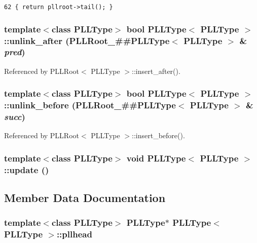 \footnotesize\begin{verbatim}62 { return pllroot->tail(); } 
\end{verbatim}\normalsize 
{}
\subsubsection{\setlength{\rightskip}{0pt plus 5cm}template$<$class PLLType$>$ bool PLLType$<$ PLLType $>$::unlink\_\-after (PLLRoot\_\-\#\#PLLType$<$ PLLType $>$ \& {\em pred})\hspace{0.3cm}{\tt  [inline]}}\label{classPLLType_a11}




Referenced by PLLRoot$<$ PLLType $>$::insert\_\-after().
\subsubsection{\setlength{\rightskip}{0pt plus 5cm}template$<$class PLLType$>$ bool PLLType$<$ PLLType $>$::unlink\_\-before (PLLRoot\_\-\#\#PLLType$<$ PLLType $>$ \& {\em succ})\hspace{0.3cm}{\tt  [inline]}}\label{classPLLType_a10}




Referenced by PLLRoot$<$ PLLType $>$::insert\_\-before().
\subsubsection{\setlength{\rightskip}{0pt plus 5cm}template$<$class PLLType$>$ void PLLType$<$ PLLType $>$::update ()\hspace{0.3cm}{\tt  [inline]}}\label{classPLLType_a18}




\subsection{Member Data Documentation}
\subsubsection{\setlength{\rightskip}{0pt plus 5cm}template$<$class PLLType$>$ PLLType$\ast$ PLLType$<$ PLLType $>$::pllhead\hspace{0.3cm}{\tt  [protected]}}\label{classPLLType_n2}




